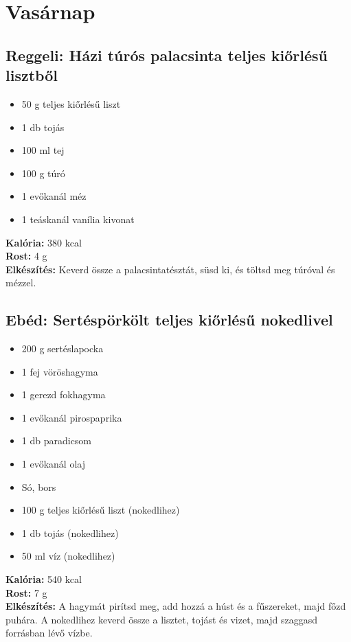 \newpage

\section{Vasárnap}
\sordisz
\subsection{Reggeli: Házi túrós palacsinta teljes kiőrlésű lisztből}
\begin{itemize}
    \item 50 g teljes kiőrlésű liszt
    \item 1 db tojás
    \item 100 ml tej
    \item 100 g túró
    \item 1 evőkanál méz
    \item 1 teáskanál vanília kivonat
\end{itemize}
\textbf{Kalória:} 380 kcal \\
\textbf{Rost:} 4 g \\
\textbf{Elkészítés:} Keverd össze a palacsintatésztát, süsd ki, és töltsd meg túróval és mézzel.

\sordisz
\subsection{Ebéd: Sertéspörkölt teljes kiőrlésű nokedlivel}
\begin{itemize}
    \item 200 g sertéslapocka
    \item 1 fej vöröshagyma
    \item 1 gerezd fokhagyma
    \item 1 evőkanál pirospaprika
    \item 1 db paradicsom
    \item 1 evőkanál olaj
    \item Só, bors
    \item 100 g teljes kiőrlésű liszt (nokedlihez)
    \item 1 db tojás (nokedlihez)
    \item 50 ml víz (nokedlihez)
\end{itemize}
\textbf{Kalória:} 540 kcal \\
\textbf{Rost:} 7 g \\
\textbf{Elkészítés:} A hagymát pirítsd meg, add hozzá a húst és a fűszereket, majd főzd puhára. A nokedlihez keverd össze a lisztet, tojást és vizet, majd szaggasd forrásban lévő vízbe.

